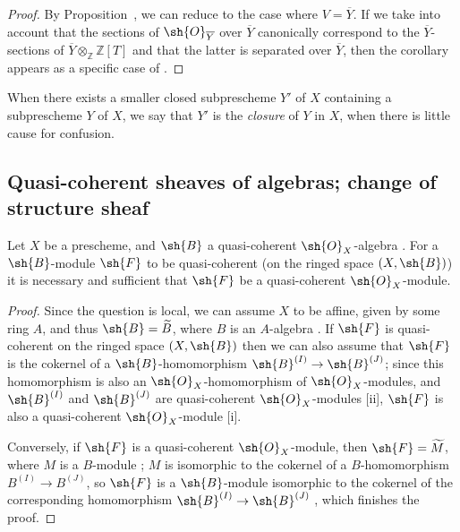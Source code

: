 \begin{proof}
By Proposition~, we can reduce to the case where $V=\overline{Y}$.
If we take into account that the sections of $\sh{O}_{\overline{Y}}$ over $\overline{Y}$ canonically correspond to the $\overline{Y}$-sections of $\overline{Y}\otimes_{\mathbb Z}\mathbb Z[T]$  and that the latter is separated over $\overline{Y}$, then the corollary appears as a specific case of .
\end{proof}

When there exists a smaller closed subprescheme $Y'$ of $X$ containing a subprescheme $Y$ of $X$, we say that $Y'$ is the \emph{closure} of $Y$ in $X$, when there is little cause for confusion.

\subsection{Quasi-coherent sheaves of algebras; change of structure sheaf}
\label{subsection:I.9.6}

\begin{proposition}[9.6.1]
\label{I.9.6.1}
Let $X$ be a prescheme, and $\sh{B}$ a quasi-coherent $\sh{O}_X$-algebra .
For a $\sh{B}$-module $\sh{F}$ to be quasi-coherent (on the ringed space $(X,\sh{B})$) it is necessary and sufficient that $\sh{F}$ be a quasi-coherent $\sh{O}_X$-module.
\end{proposition}

\begin{proof}
Since the question is local, we can assume $X$ to be affine, given by some ring $A$, and thus $\sh{B}=\widetilde{B}$, where $B$ is an $A$-algebra .
If $\sh{F}$ is quasi-coherent on the ringed space $(X,\sh{B})$ then we can also assume that $\sh{F}$ is the cokernel of a $\sh{B}$-homomorphism $\sh{B}^{(I)}\to\sh{B}^{(J)}$; since this homomorphism is also an $\sh{O}_X$-homomorphism of $\sh{O}_X$-modules, and $\sh{B}^{(I)}$ and $\sh{B}^{(J)}$ are quasi-coherent $\sh{O}_X$-modules [ii], $\sh{F}$ is also a quasi-coherent $\sh{O}_X$-module [i].

Conversely, if $\sh{F}$ is a quasi-coherent $\sh{O}_X$-module, then $\sh{F}=\widetilde{M}$, where $M$ is a $B$-module ; $M$ is isomorphic to the cokernel of a $B$-homomorphism $B^{(I)}\to B^{(J)}$, so $\sh{F}$ is a $\sh{B}$-module isomorphic to the cokernel of the corresponding homomorphism $\sh{B}^{(I)}\to\sh{B}^{(J)}$ , which finishes the proof.
\end{proof}


